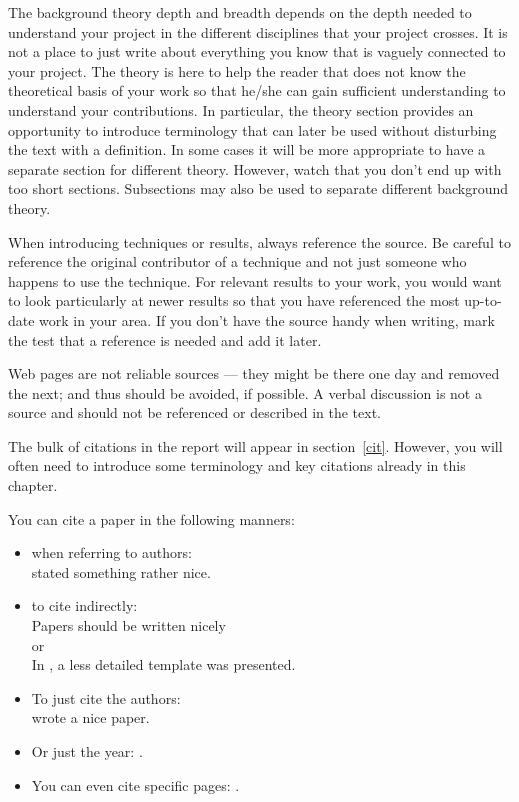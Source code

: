
The background theory depth and breadth depends on the depth needed to understand your project in the different disciplines that your project crosses.  It is not a place to just write about everything you know that is vaguely connected to your project. The theory is here to help the reader that does not know the theoretical basis of your work so that he/she can gain sufficient understanding to understand your contributions. In particular, the theory section provides an opportunity to introduce terminology that can later be used without disturbing the text with a definition.  In some cases it will be more appropriate to have a separate section for different theory. However, watch that you don't end up with too short sections. Subsections may also be used to separate different background theory.

When introducing techniques or results, always reference the source. Be careful to reference the original contributor of a technique and not just someone who happens to use the technique. For relevant results to your work, you would want to look particularly at newer results so that you have referenced the most up-to-date work in your area. If you don't have the source handy when writing, mark the test that a reference is needed and add it later.

Web pages are not reliable sources --- they might be there one day and removed the next; and thus should be avoided, if possible. A verbal discussion is not a source and should not be referenced or described in the text.

The bulk of citations in the report will appear in section~\ref{cit}. However, you will often need to introduce some terminology and key citations already in this chapter.

You can cite a paper in the following manners:

\begin{itemize}
    \item when referring to authors:\\
          \citet{Bandara2019} stated something rather nice.
    \item to cite indirectly: \\
          Papers should be written nicely \citep{Bandara2019}\\
          or\\
          In \cite{Bandara2019}, a less detailed template was presented.
    \item To just cite the authors: \\
          \citeauthor{Bandara2019} wrote a nice paper.
    \item Or just the year: \citeyear{Bandara2019}.
    \item You can even cite specific pages: \citet[p. 3]{Bandara2019}.
\end{itemize}

